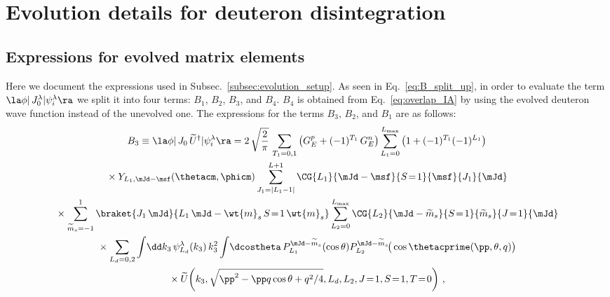 \cleardoublepage
\chapter{Evolution details for deuteron disintegration}
\label{Appendix:evolution_details}

  \section{Expressions for evolved matrix elements}
  \label{Appendix:sec:evolution_expressions}

  Here we document the expressions used in Subsec.~\ref{subsec:evolution_setup}.
  As seen in Eq.~\eqref{eq:B_split_up}, in order to evaluate the term $\la \phi|
  \, J_0^\lambda | \psi_i^\lambda \ra$ we split it into four terms: $B_1$,
  $B_2$, $B_3$, and $B_4$.  $B_4$ is obtained from Eq.~\eqref{eq:overlap_IA} by
  using the evolved deuteron wave function instead of the unevolved one.  The
  expressions for the terms $B_3$, $B_2$, and $B_1$ are as follows:
  \begin{multline}
   B_3 \equiv \la \phi | \, J_0 \, \widetilde{U}^\dag | \psi_i^\lambda \ra
   = 2 \, \sqrt{\frac{2}{\pi}} \,
   \sum_{T_1 = 0,1} \big(G_E ^p + (-1)^{T_1} \, G_E^n\big)
   \sum_{L_1 = 0}^{L_{\rm max}} \big(1 + (-1)^{T_1} (-1)^{L_1}\big) \\
   \null \times Y_{L_1 , \mJd - \msf} (\thetacm, \phicm)
   \sum_{J_1 = |L_1 - 1|}^{L+1}
   \CG{L_1}{\mJd - \msf}{S\!=\!1}{\msf}{J_1}{\mJd} \\
   \null \times \sum_{\widetilde{m}_s = -1}^1
   \braket{J_1 \, \mJd}{L_1 \, \mJd - \wt{m}_s \, S\!=\!1 \, \wt{m}_s}
   \sum_{L_2 = 0}^{L_{\rm max}}
   \CG{L_2}{\mJd-\widetilde{m}_s}{S\!=\!1}{\widetilde{m}_s}{J\!=\!1}{\mJd} \\
   \null \times \sum_{L_d = 0, 2}
   \int \! \dd k_3 \, \psi_{L_d}^\lambda(k_3) \, k_3^2 \int \! \dcostheta \,
    P_{L_1}^{\mJd-\widetilde{m}_s}(\cos \theta)
    P_{L_2}^{\mJd-\widetilde{m}_s}\!\big(\cos\thetacprime(\pp, \theta, q)\big)
    \\ \null \times
    \widetilde{U}\!\left(
     k_3, \sqrt{{\pp}^2 - \pp q \cos\theta + q^2/4}, L_d, L_2, J\!=\!1, S\!=\!1,
     T\!=\!0 \right) \,,
  \end{multline}
